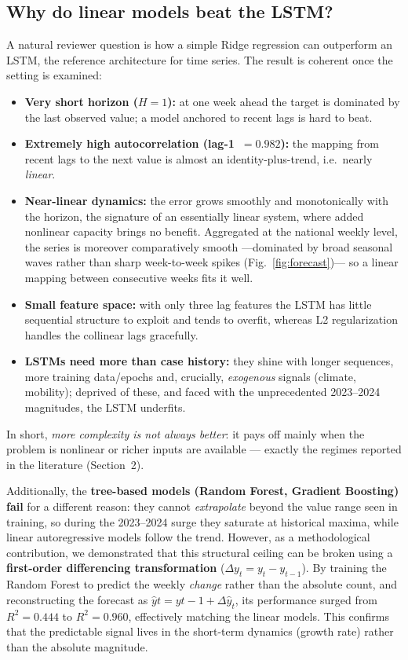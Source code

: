 \documentclass[runningheads]{llncs}
\begin{document}
\subsection{Why do linear models beat the LSTM?}
A natural reviewer question is how a simple Ridge regression can outperform an LSTM, the
reference architecture for time series. The result is coherent once the setting is examined:
\begin{itemize}\itemsep1pt
  \item \textbf{Very short horizon ($H=1$):} at one week ahead the target is dominated by the
  last observed value; a model anchored to recent lags is hard to beat.
  \item \textbf{Extremely high autocorrelation (lag-1~$=0.982$):} the mapping from recent
  lags to the next value is almost an identity-plus-trend, i.e.\ nearly \emph{linear}.
  \item \textbf{Near-linear dynamics:} the error grows smoothly and monotonically with the
  horizon, the signature of an essentially linear system, where added nonlinear capacity
  brings no benefit. Aggregated at the national weekly level, the series is moreover
  comparatively smooth ---dominated by broad seasonal waves rather than sharp week-to-week
  spikes (Fig.~\ref{fig:forecast})--- so a linear mapping between consecutive weeks fits it
  well.
  \item \textbf{Small feature space:} with only three lag features the LSTM has little
  sequential structure to exploit and tends to overfit, whereas L2 regularization handles the
  collinear lags gracefully.
  \item \textbf{LSTMs need more than case history:} they shine with longer sequences, more
  training data/epochs and, crucially, \emph{exogenous} signals (climate, mobility); deprived
  of these, and faced with the unprecedented 2023--2024 magnitudes, the LSTM underfits.
\end{itemize}
In short, \emph{more complexity is not always better}: it pays off mainly when the problem is
nonlinear or richer inputs are available --- exactly the regimes reported in the literature
(Section~2).

Additionally, the \textbf{tree-based models (Random Forest, Gradient Boosting) fail} for a
different reason: they cannot \emph{extrapolate} beyond the value range seen in training, so
during the 2023--2024 surge they saturate at historical maxima, while linear autoregressive
models follow the trend.
However, as a methodological contribution, we demonstrated that this structural ceiling can be broken using a \textbf{first-order differencing transformation} ($\Delta y_t = y_t - y_{t-1}$). By training the Random Forest to predict the weekly \emph{change} rather than the absolute count, and reconstructing the forecast as $\hat{y}t = y{t-1} + \Delta\hat{y}_t$, its performance surged from $R^2=0.444$ to $R^2=0.960$, effectively matching the linear models. This confirms that the predictable signal lives in the short-term dynamics (growth rate) rather than the absolute magnitude.
\end{document}
